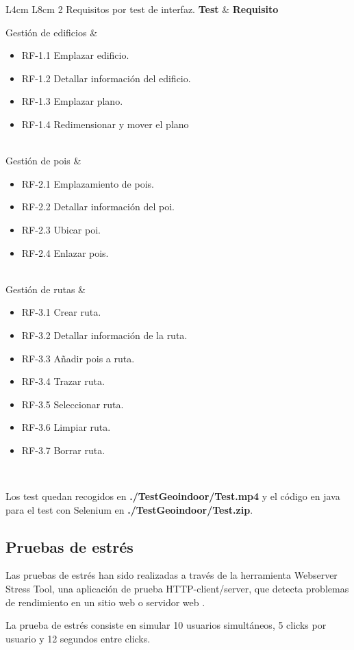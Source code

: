 {L{4cm} L{8cm}}
{2}
{Requisitos por test de interfaz.}
{\textbf{Test} & \textbf{Requisito} \\}
{Gestión de edificios 		&
	\begin{itemize}
		\item RF-1.1 Emplazar edificio.
		\item RF-1.2 Detallar información del edificio.
		\item RF-1.3 Emplazar plano.
		\item RF-1.4 Redimensionar y mover el plano
	\end{itemize}  				
	\\
	Gestión de pois &
	\begin{itemize}
		\item RF-2.1 Emplazamiento de pois.
		\item RF-2.2 Detallar información del poi.
		\item RF-2.3 Ubicar poi.
		\item RF-2.4 Enlazar pois.
	\end{itemize}
	\\  				
	Gestión de rutas &
	\begin{itemize}
		\item RF-3.1 Crear ruta.
		\item RF-3.2 Detallar información de la ruta.
		\item RF-3.3 Añadir pois a ruta.
		\item RF-3.4 Trazar ruta.
		\item RF-3.5 Seleccionar ruta.
		\item RF-3.6 Limpiar ruta.
		\item RF-3.7 Borrar ruta.
	\end{itemize}  				
	\\}

Los test quedan recogidos en \textbf{./TestGeoindoor/Test.mp4} y el código en java para el test con Selenium en \textbf{./TestGeoindoor/Test.zip}.
\subsection{Pruebas de estrés}

Las pruebas de estrés han sido realizadas a través de la herramienta Webserver Stress Tool, una aplicación de prueba HTTP-client/server, que detecta problemas de rendimiento en un sitio web o servidor web \cite{webserverstresstool}. 

La prueba de estrés consiste en simular 10 usuarios simultáneos, 5 clicks por usuario y 12 segundos entre clicks.


